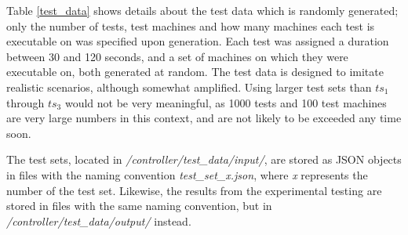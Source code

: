 Table \ref{test_data} shows details about the test data which is randomly generated; only the number of tests, test machines and how many machines each test is executable on was specified upon generation. Each test was assigned a duration between 30 and 120 seconds, and a set of machines on which they were executable on, both generated at random. The test data is designed to imitate realistic scenarios, although somewhat amplified. Using larger test sets than $ts_1$ through $ts_3$ would not be very meaningful, as 1000 tests and 100 test machines are very large numbers in this context, and are not likely to be exceeded any time soon.

The test sets, located in \emph{/controller/test\_data/input/}, are stored as JSON objects in files with the naming convention \emph{{test\_set\_x.json}}, where \emph{x} represents the number of the test set. Likewise, the results from the experimental testing are stored in files with the same naming convention, but in \emph{/controller/test\_data/output/} instead.

